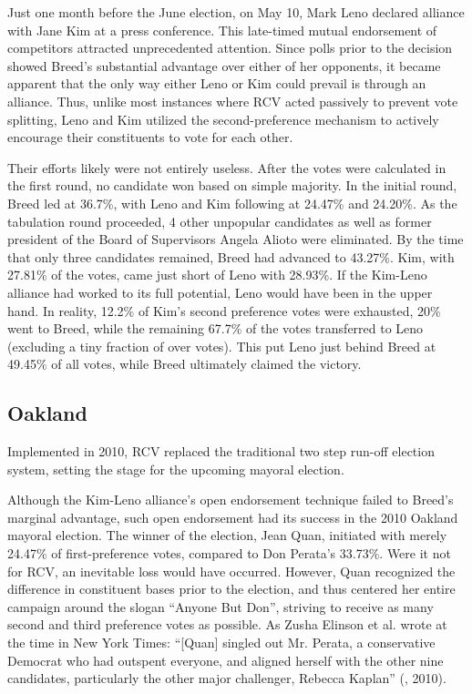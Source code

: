 \documentclass[12pt, a4paper, twoside]{article}
\begin{document}
Just one month before the June election, on May 10, Mark Leno declared alliance with Jane Kim at a press conference. This late-timed mutual endorsement of competitors attracted unprecedented attention. Since polls prior to the decision showed Breed’s substantial advantage over either of her opponents, it became apparent that the only way either Leno or Kim could prevail is through an alliance. Thus, unlike most instances where RCV acted passively to prevent vote splitting, Leno and Kim utilized the second-preference mechanism to actively encourage their constituents to vote for each other. 

Their efforts likely were not entirely useless. After the votes were calculated in the first round, no candidate won based on simple majority. In the initial round, Breed led at 36.7\%, with Leno and Kim following at 24.47\% and 24.20\%. As the tabulation round proceeded, 4 other unpopular candidates as well as former president of the Board of Supervisors Angela Alioto were eliminated. By the time that only three candidates remained, Breed had advanced to 43.27\%. Kim, with 27.81\% of the votes, came just short of Leno with 28.93\%. If the Kim-Leno alliance had worked to its full potential, Leno would have been in the upper hand. In reality, 12.2\% of Kim’s second preference votes were exhausted, 20\% went to Breed, while the remaining 67.7\% of the votes transferred to Leno (excluding a tiny fraction of over votes). This put Leno just behind Breed at 49.45\% of all votes, while Breed ultimately claimed the victory.

\subsection{Oakland}

Implemented in 2010, RCV replaced the traditional two step run-off election system, setting the stage for the upcoming mayoral election. 

Although the Kim-Leno alliance’s open endorsement technique failed to Breed’s marginal advantage, such open endorsement had its success in the 2010 Oakland mayoral election. The winner of the election, Jean Quan, initiated with merely 24.47\% of first-preference votes, compared to Don Perata’s 33.73\%. Were it not for RCV, an inevitable loss would have occurred. However, Quan recognized the difference in constituent bases prior to the election, and thus centered her entire campaign around the slogan “Anyone But Don”, striving to receive as many second and third preference votes as possible. As Zusha Elinson et al. wrote at the time in New York Times: “[Quan] singled out Mr. Perata, a conservative Democrat who had outspent everyone, and aligned herself with the other nine candidates, particularly the other major challenger, Rebecca Kaplan” (\cite{elinson2010}, 2010).
\end{document}
